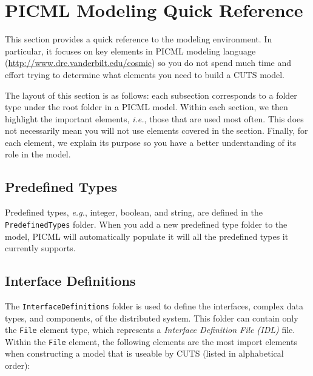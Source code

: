 
\newenvironment{modelelement}[3]{
\begin{figure}[h!]
  \texttt{[image: \#3]}
\end{figure}
\subsection*{#1}
}{\begin{center}
\line(1,0){300}
\end{center}}

\chapter{PICML Modeling Quick Reference}
\label{sec:modeling-quick-ref}

This section provides a quick reference to the modeling
environment. In particular, it focuses on key elements in 
PICML modeling language (\url{http://www.dre.vanderbilt.edu/cosmic}) 
so you do not spend much time and
effort trying to determine what elements you need to build
a CUTS model.

The layout of this section is as follows: each subsection
corresponds to a folder type under the root folder in a 
PICML model. Within each section, we then highlight the 
important elements, \textit{i.e.}, those that are used most
often. This does not necessarily mean you will not use elements
covered in the section. Finally, for each element, we explain
its purpose so you have a better understanding of its role 
in the model.

\section{Predefined Types}

Predefined types, \textit{e.g.}, integer, boolean, and string, 
are defined in the \texttt{PredefinedTypes} folder. When you 
add a new predefined type folder to the model, PICML will 
automatically populate it will all the predefined types it 
currently supports.

\section{Interface Definitions}

The \texttt{InterfaceDefinitions} folder is used to define the 
interfaces, complex data types, and components, of the distributed
system. This folder can contain only the \texttt{File} element
type, which represents a \textit{Interface Definition File (IDL)}
file. Within the \texttt{File} element, the following elements are 
the most import elements when constructing a model that is useable
by CUTS (listed in alphabetical order):


